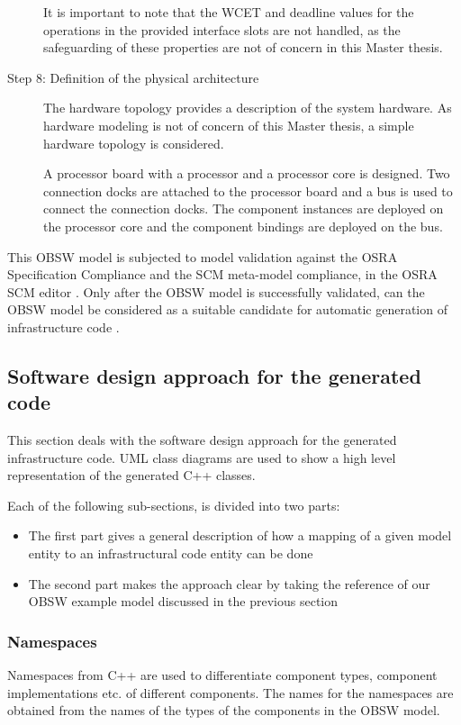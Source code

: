 \begin{description}
It is important to note that the WCET and deadline values for the operations in the provided interface slots are not handled, as the safeguarding of these properties are not of concern in this Master thesis. 

\item [Step 8: Definition of the physical architecture] The hardware topology provides a description of the system hardware. As hardware modeling is not of concern of this Master thesis, a simple hardware topology is considered. 

A processor board with a processor and a processor core is designed. Two connection docks are attached to the processor board and a bus is used to connect the connection docks. The component instances are deployed on the processor core and the component bindings are deployed on the bus. 
\end{description}

This OBSW model is subjected to model validation against the OSRA Specification Compliance and the SCM meta-model compliance, in the OSRA SCM editor \cite{OSRAEditor}. Only after the OBSW model is successfully validated, can the OBSW model be considered as a suitable candidate for automatic generation of infrastructure code \cite{OSRAEditor}.  
   
\subsection{Software design approach for the generated code}
This section deals with the software design approach for the generated infrastructure code. UML class diagrams are used to show a high level representation of the generated C++ classes. 

Each of the following sub-sections, is divided into two parts:
\begin{itemize}
\item The first part gives a general description of how a mapping of a given model entity to an infrastructural code entity can be done
\item The second part makes the approach clear by taking the reference of our OBSW example model discussed in the previous section  
\end{itemize}

\subsubsection{Namespaces}
Namespaces from C++ are used to differentiate component types, component implementations etc. of different components. The names for the namespaces are obtained from the names of the types of the components in the OBSW model.


